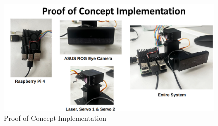 \documentclass[a4paper,11pt]{article}%
\begin{document}
\begin{figure}[H]
    \centering
    \includegraphics[scale=0.4]{figures/pf_implementation.png}
    \caption{Proof of Concept Implementation}
\end{figure}
\end{document}

